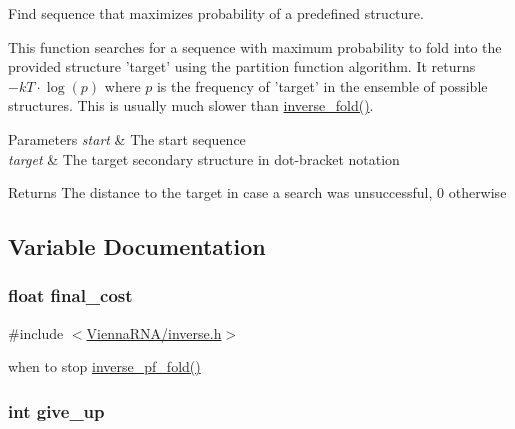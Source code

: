 Find sequence that maximizes probability of a predefined structure. 

This function searches for a sequence with maximum probability to fold into the provided structure 'target' using the partition function algorithm. It returns $-kT \cdot \log(p)$ where $p$ is the frequency of 'target' in the ensemble of possible structures. This is usually much slower than \hyperlink{group__inverse__fold_ga7af026de55d4babad879f2c92559cbbc}{inverse\+\_\+fold()}.


\begin{DoxyParams}{Parameters}
{\em start} & The start sequence \\
\hline
{\em target} & The target secondary structure in dot-\/bracket notation \\
\hline
\end{DoxyParams}
\begin{DoxyReturn}{Returns}
The distance to the target in case a search was unsuccessful, 0 otherwise 
\end{DoxyReturn}


\subsection{Variable Documentation}
\hypertarget{group__inverse__fold_ga7f17d3b169af048d32bb185039a9c09c}{
\subsubsection[{final\+\_\+cost}]{\setlength{\rightskip}{0pt plus 5cm}float final\+\_\+cost}}\label{group__inverse__fold_ga7f17d3b169af048d32bb185039a9c09c}


{\ttfamily \#include $<$\hyperlink{inverse_8h}{Vienna\+R\+N\+A/inverse.\+h}$>$}

when to stop \hyperlink{group__inverse__fold_gaeef52ecbf2a2450ad585a344f9826806}{inverse\+\_\+pf\+\_\+fold()} \hypertarget{group__inverse__fold_ga7ec4ba51f86e1717a1e174264e4a75ce}{
\subsubsection[{give\+\_\+up}]{\setlength{\rightskip}{0pt plus 5cm}int give\+\_\+up}}\label{group__inverse__fold_ga7ec4ba51f86e1717a1e174264e4a75ce}


